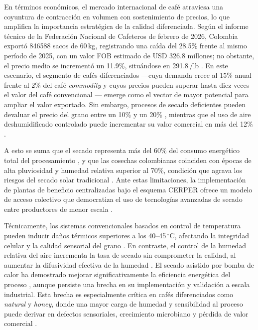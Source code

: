 En términos económicos, el mercado internacional de café atraviesa una coyuntura de 
contracción en volumen con sostenimiento de precios, lo que amplifica la importancia 
estratégica de la calidad diferenciada. Según el informe técnico de la Federación 
Nacional de Cafeteros de febrero de 2026, Colombia exportó 846588 sacos de 60\,kg, 
registrando una caída del 28.5\% frente al mismo período de 2025, con un valor FOB 
estimado de USD 326.8 millones; no obstante, el precio medio se incrementó un 11.9\%, 
situándose en 291.8\,\textcent/lb \parencite{direccion_de_investigaciones_economicas_fnc_informe_2026}. En este 
escenario, el segmento de cafés diferenciados —cuya demanda crece al 15\% anual frente 
al 2\% del café \textit{commodity} \parencite{barbosa_sensory_2019} y cuyos precios 
pueden superar hasta diez veces el valor del café convencional 
\parencite{tabarquino_munoz_cadena_2025}— emerge como el vector de mayor potencial para 
ampliar el valor exportado. Sin embargo, procesos de secado deficientes pueden devaluar 
el precio del grano entre un 10\% y un 20\% \parencite{ferreira_bernardes_pereira_influence_2020}, 
mientras que el uso de aire deshumidificado controlado puede incrementar su valor 
comercial en más del 12\% \parencite{konopatzki_price_2019}.

A esto se suma que el 
secado representa más del 60\% del consumo energético total del procesamiento 
\parencite{coradi_development_2021, cruz-ospina_improving_2026}, y que las cosechas 
colombianas coinciden con épocas de alta pluviosidad y humedad relativa superior al 
70\%, condición que agrava los riesgos del secado solar tradicional 
\parencite{largoavila_changes_2023, osorio_hernandez_bioclimatic_2018}. Ante estas limitaciones, la implementación de 
plantas de beneficio centralizadas bajo el esquema CERPER ofrece un modelo de acceso 
colectivo que democratiza el uso de tecnologías avanzadas de secado entre productores 
de menor escala \parencite{khathir_drying_2024}.

Técnicamente, los sistemas convencionales basados en control de temperatura pueden 
inducir daños térmicos superiores a los 40--45\,$^\circ$C, afectando la integridad 
celular y la calidad sensorial del grano \parencite{borem_quality_2018, 
oliveira_quality_2018, alves_physiological_2017}. En contraste, el control de la 
humedad relativa del aire incrementa la tasa de secado sin comprometer la calidad, al 
aumentar la difusividad efectiva de la humedad \parencite{phitakwinai_thinlayer_2019, 
andrade_mathematical_2019, borem_quality_2018}. El secado asistido por bomba de calor 
ha demostrado mejorar significativamente la eficiencia energética del proceso 
\parencite{fauzi_influence_2024}, aunque persiste una brecha en su implementación y 
validación a escala industrial. Esta brecha es especialmente crítica en cafés 
diferenciados como \textit{natural} y \textit{honey}, donde una mayor carga de humedad 
y sensibilidad al proceso puede derivar en defectos sensoriales, crecimiento microbiano 
y pérdida de valor comercial \parencite{borem_quality_2018, parra-coronado_preliminary_2020}.

